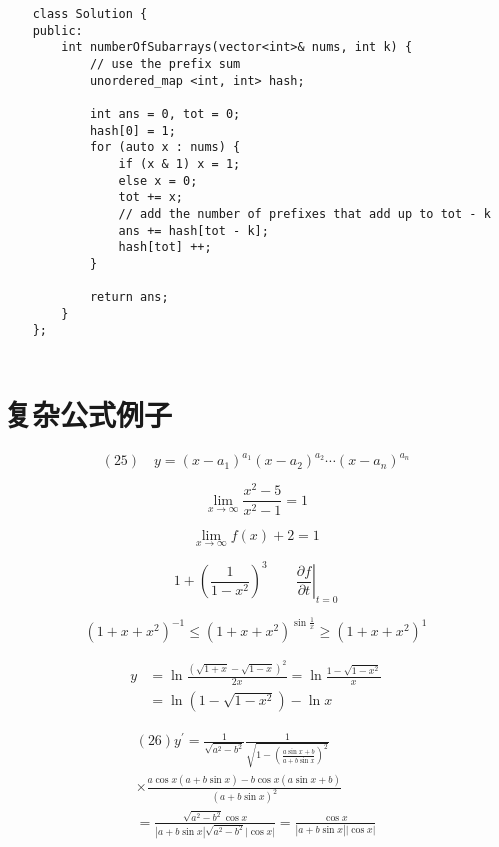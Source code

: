\documentclass{article}
\begin{document}
    \begin{verbatim}
    class Solution {
    public:
        int numberOfSubarrays(vector<int>& nums, int k) {
            // use the prefix sum
            unordered_map <int, int> hash;
             
            int ans = 0, tot = 0;
            hash[0] = 1;
            for (auto x : nums) {
                if (x & 1) x = 1;
                else x = 0;
                tot += x;
                // add the number of prefixes that add up to tot - k
                ans += hash[tot - k]; 
                hash[tot] ++;
            }
            
            return ans;
        }
    };
            
    \end{verbatim}


\section{复杂公式例子}
    \[
    (25)\quad y=\left(x-a_{1}\right)^{a_{1}}\left(x-a_{2}\right)^{a_{2}} \cdots\left(x-a_{n}\right)^{a_{n}}
    \]

    \[
    \lim _{x \rightarrow \infty} \frac{x^{2}-5}{x^{2}-1}=1
    \]

    $$\lim _{x \rightarrow \infty} {f(x)+ 2} = 1$$

    \[
    1 + \left(\frac{1}{1-x^{2}}\right)^3 \qquad
    \left. \frac{\partial f}{\partial t}
    \right|_{t = 0}
    \]

    \[(1 + x + x^2)^{-1} \leqslant (1 + x + x^2)^{\sin\frac{1}{x}} \geqslant (1+x+x^2)^{1}\] %

    \[
    \begin{aligned} y &=\ln \frac{(\sqrt{1+x}-\sqrt{1-x})^{2}}{2 x}=\ln \frac{1-\sqrt{1-x^{2}}}{x} \\ &=\ln (1-\sqrt{1-x^{2}})-\ln x \end{aligned}
    \]


    \[
    \begin{array}{l}{(26) y^{\prime}=\frac{1}{\sqrt{a^{2}-b^{2}}} \frac{1}{\sqrt{1-\left(\frac{a \sin x+b}{a+b \sin x}\right)^{2}}}} \\ {\times \frac{a \cos x(a+b \sin x)-b \cos x(a \sin x+b)}{(a+b \sin x)^{2}}} \\ {=\frac{\sqrt{a^{2}-b^{2}} \cos x}{|a+b \sin x| \sqrt{a^{2}-b^{2}}|\cos x|}=\frac{\cos x}{|a+b \sin x||\cos x|}}\end{array}
    \]
\end{document}
